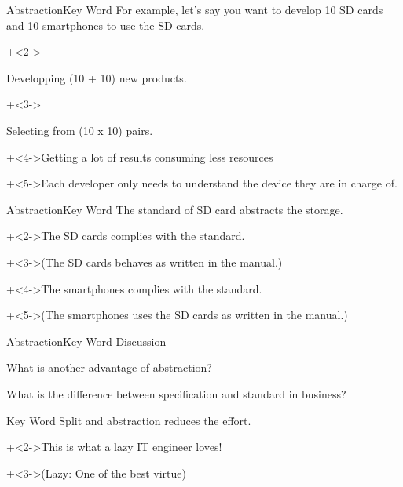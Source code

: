 \begin{frame}[t]{Abstraction}{Key Word}
    For example, let's say you want to develop 10 SD cards and 10 smartphones to use the SD cards.
    \vspace{4ex}

    \begin{itemize}
        \onslide+<2->{\item[Cost]   Developping (10 + 10) new products.}
        \onslide+<3->{\item[Usage]    Selecting from (10 x 10) pairs.}
    \end{itemize}
    \vspace{4ex}

    \onslide+<4->{Getting a lot of results consuming less resources}
    \vspace{2ex}

    \onslide+<5->{Each developer only needs to understand the device they are in charge of.}
\end{frame}


\begin{frame}{Abstraction}{Key Word}
    The standard of SD card abstracts the storage.
    \vspace{4ex}

    \onslide+<2->{The SD cards complies with the standard.}
    \vspace{2ex}

    \onslide+<3->{(The SD cards behaves as written in the manual.)}
    \vspace{4ex}

    \onslide+<4->{The smartphones complies with the standard.}
    \vspace{2ex}

    \onslide+<5->{(The smartphones uses the SD cards as written in the manual.)}
\end{frame}


\begin{frame}{Abstraction}{Key Word}
    Discussion
    \vspace{4ex}

    What is another advantage of abstraction?
    \vspace{2ex}

    What is the difference between specification and standard in business?
\end{frame}


\begin{frame}{Key Word}
    Split and abstraction reduces the effort.
    \vspace{4ex}

    \onslide+<2->{This is what a lazy IT engineer loves!}
    \vspace{2ex}

    \onslide+<3->{{\Large (Lazy: One of the best virtue)}}
\end{frame}


